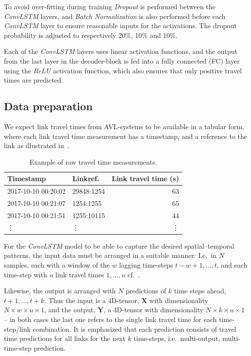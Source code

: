 \documentclass[preprint,11pt,5p,twocolumn]{elsarticle}
\newcommand{\matr}[1]{\mathbf{#1}}
\begin{document}
To avoid over-fitting during training \emph{Dropout} \cite{Dropout} is performed between the \emph{ConvLSTM} layers, and \emph{Batch Normalization} \cite{BatchNorm} is also performed before each \emph{ConvLSTM} layer to ensure reasonable inputs for the activations. The dropout probability is adjusted to respectively 20\%, 10\% and 10\%.

Each of the \emph{ConvLSTM} layers uses linear activation functions, and the output from the last layer in the decoder-block is fed into a fully connected (FC) layer using the \emph{ReLU} activation function, which also ensures that only positive travel times are predicted.

\subsection{Data preparation}
We expect link travel times from AVL-systems to be available in a tabular form, where each link travel time measurement has a timestamp, and a reference to the link as illustrated in~.
\begin{table}[!ht]
  \centering
  \footnotesize
  \begin{tabular}{llr}
    Timestamp & Linkref. & Link travel time (s) \\ \hline \hline
    2017-10-10 00:20:02 & 29848:1254 & 63 \\ \hline
    2017-10-10 00:21:07 & 1254:1255  & 65 \\ \hline
    2017-10-10 00:21:51 & 1255:10115 & 44 \\ \hline
    \vdots & \vdots & \vdots 
  \end{tabular}
  \caption{Example of raw travel time measurements.}
  \label{tab:data}
\end{table}

For the \emph{ConvLSTM} model to be able to capture the desired spatial--temporal patterns, the input data must be arranged in a suitable manner: I.e.\ in $N$ samples, each with a window of the $w$ lagging time-steps $t-w+1, \ldots, t$, and each time-step with $u$ link travel times $1, \ldots, u$ cf.~.

Likewise, the output is arranged with $N$ predictions of $k$ time steps ahead, $t+1, \ldots, t+k$. Thus the input is a 4D-tensor, $\matr{X}$ with dimensionality $N \times w \times u \times 1$, and the output, $\matr{Y}$, a 4D-tensor with dimensionality $N \times k \times u \times 1$ -- in both cases the last one refers to the single link travel time for each time-step/link combination. It is emphasized that each prediction consists of travel time predictions for all links for the next $k$ time-steps, i.e.\ multi-output, multi-time-step prediction.
\end{document}
